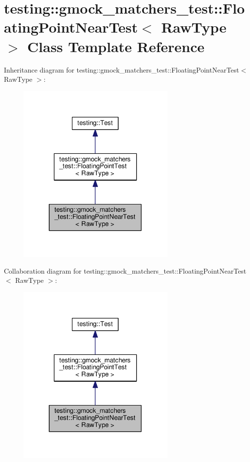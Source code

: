 \hypertarget{classtesting_1_1gmock__matchers__test_1_1FloatingPointNearTest}{}\section{testing\+:\+:gmock\+\_\+matchers\+\_\+test\+:\+:Floating\+Point\+Near\+Test$<$ Raw\+Type $>$ Class Template Reference}
\label{classtesting_1_1gmock__matchers__test_1_1FloatingPointNearTest}


Inheritance diagram for testing\+:\+:gmock\+\_\+matchers\+\_\+test\+:\+:Floating\+Point\+Near\+Test$<$ Raw\+Type $>$\+:
\nopagebreak
\begin{figure}[H]
\begin{center}
\leavevmode
\includegraphics[width=222pt]{classtesting_1_1gmock__matchers__test_1_1FloatingPointNearTest__inherit__graph}
\end{center}
\end{figure}


Collaboration diagram for testing\+:\+:gmock\+\_\+matchers\+\_\+test\+:\+:Floating\+Point\+Near\+Test$<$ Raw\+Type $>$\+:
\nopagebreak
\begin{figure}[H]
\begin{center}
\leavevmode
\includegraphics[width=222pt]{classtesting_1_1gmock__matchers__test_1_1FloatingPointNearTest__coll__graph}
\end{center}
\end{figure}
